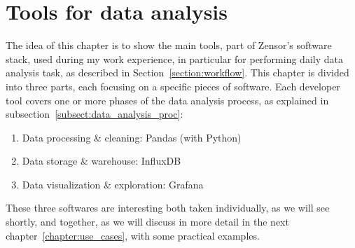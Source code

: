 \chapter{Tools for data analysis}\label{chapter:tools}
The idea of this chapter is to show the main tools, part of Zensor's software stack, used during my work experience, in particular for performing daily data analysis task, as described in Section~\ref{section:workflow}.
This chapter is divided into three parts, each focusing on a specific pieces of software. Each developer tool covers one or more phases of the data analysis process, as explained in subsection~\ref{subsect:data_analysis_proc}:
\begin{enumerate}
    \item Data processing \& cleaning: Pandas (with Python)
    \item Data storage \& warehouse: InfluxDB
    \item Data visualization \& exploration: Grafana
\end{enumerate}
These three softwares are interesting both taken individually, as we will see shortly, and together, as we will discuss in more detail in the next chapter~\ref{chapter:use_cases}, with some practical examples.





